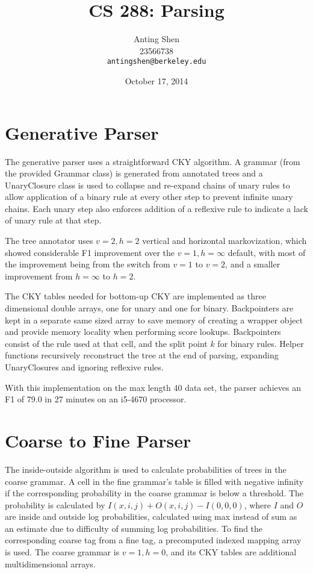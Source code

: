 \documentclass[11pt]{article}
\title{CS 288: Parsing}
\author{Anting Shen \\
  23566738 \\
  {\tt antingshen@berkeley.edu} \\
}
\date{October 17, 2014}
\begin{document}
\maketitle


\section{Generative Parser}

The generative parser uses a straightforward CKY algorithm. A grammar
(from the provided Grammar class) is generated from annotated
trees and a UnaryClosure class is used to collapse and re-expand chains of unary rules to allow
application of a binary rule at every other step to prevent infinite unary chains. Each unary
step also enforces addition of a reflexive rule to indicate a lack of unary rule at that step.

The tree annotator uses $v=2, h=2$ vertical and horizontal markovization, which showed considerable
F1 improvement over the $v=1, h=\infty$ default, with most of the improvement being from the
switch from $v=1$ to $v=2$, and a smaller improvement from $h=\infty$ to $h=2$.

The CKY tables needed for bottom-up CKY are implemented as three dimensional double arrays, one for
unary and one for binary. Backpointers are kept in a separate same sized array to save memory of
creating a wrapper object and provide memory locality when performing score lookups. Backpointers
consist of the rule used at that cell, and the split point $k$ for binary rules. Helper functions
recursively reconstruct the tree at the end of parsing, expanding UnaryClosures and ignoring reflexive
rules.

With this implementation on the max length 40 data set, the parser achieves an F1 of 79.0
in 27 minutes on an i5-4670 processor.

\section{Coarse to Fine Parser}

The inside-outside algorithm is used to calculate probabilities of trees in the coarse grammar.
A cell in the fine grammar's table is filled with negative infinity if the corresponding probability
in the coarse grammar is below a threshold. The probability is calculated by
$I(x,i,j)+O(x,i,j)-I(0,0,0)$, where $I$ and $O$ are inside and outside log probabilities, calculated
using max instead of sum as an estimate due to difficulty of summing log probabilities.
To find the corresponding coarse tag from a fine tag, a precomputed indexed mapping array is used.
The coarse grammar is $v=1, h=0$, and its CKY tables are additional multidimensional arrays.
\end{document}
